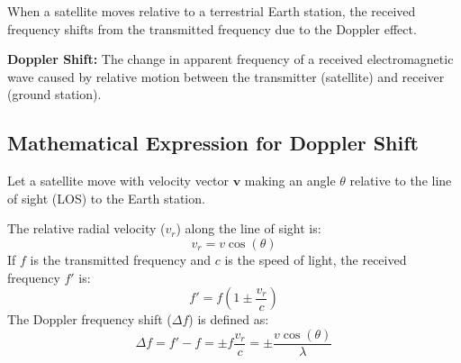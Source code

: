 \documentclass[12pt,a4paper]{article}
\begin{document}
When a satellite moves relative to a terrestrial Earth station, the received frequency shifts from the transmitted frequency due to the Doppler effect.

\begin{tcolorbox}[defbox]
\textbf{Doppler Shift:} The change in apparent frequency of a received electromagnetic wave caused by relative motion between the transmitter (satellite) and receiver (ground station).
\end{tcolorbox}

\subsection{Mathematical Expression for Doppler Shift}
Let a satellite move with velocity vector $\mathbf{v}$ making an angle $\theta$ relative to the line of sight (LOS) to the Earth station.

\begin{tcolorbox}[tikzbox, title={Doppler Vector Components}]
\centering
{}
\end{tcolorbox}

The relative radial velocity ($v_r$) along the line of sight is:
\begin{equation}
  v_r = v \cos(\theta)
\end{equation}
If $f$ is the transmitted frequency and $c$ is the speed of light, the received frequency $f'$ is:
\begin{equation}
  f' = f \left( 1 \pm \frac{v_r}{c} \right)
\end{equation}
The Doppler frequency shift ($\Delta f$) is defined as:
\begin{equation}
  \Delta f = f' - f = \pm f \frac{v_r}{c} = \pm \frac{v \cos(\theta)}{\lambda}
\end{equation}
\end{document}
